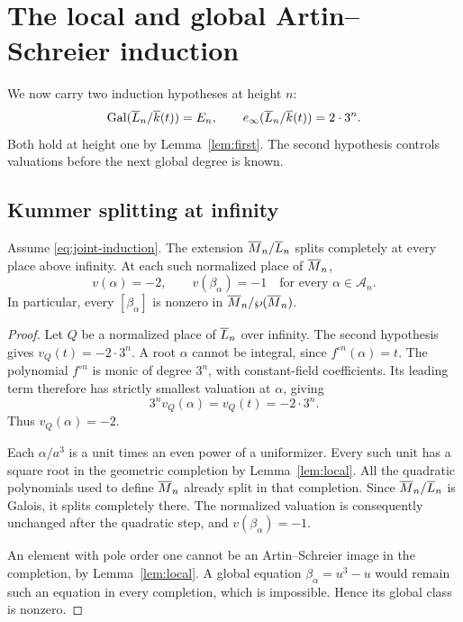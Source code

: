 \section{The local and global Artin--Schreier induction}\label{sec:as}

We now carry two induction hypotheses at height $n$:
\begin{equation}\label{eq:joint-induction}
 \operatorname{Gal}(\overline{L}_n/\overline{k}(t))=E_n,
 \qquad e_\infty(\overline{L}_n/\overline{k}(t))=2\cdot3^n.
\end{equation}
Both hold at height one by Lemma~\ref{lem:first}. The second
hypothesis controls valuations before the next global degree is
known.

\subsection{Kummer splitting at infinity}

\begin{lemma}\label{lem:pole}
Assume \eqref{eq:joint-induction}. The extension
$\overline{M}_n/\overline{L}_n$ splits completely at every place above infinity.
At each such normalized place of $\overline{M}_n$,
\begin{equation}\label{eq:beta-pole}
 v(\alpha)=-2,\qquad v(\beta_\alpha)=-1
 \quad\text{for every }\alpha\in\mathcal A_n.
\end{equation}
In particular, every $[\beta_\alpha]$ is nonzero in
$\overline{M}_n/\wp(\overline{M}_n)$.
\end{lemma}

\begin{proof}
Let $Q$ be a normalized place of $\overline{L}_n$ over infinity.
The second hypothesis gives $v_Q(t)=-2\cdot3^n$.
A root $\alpha$ cannot be integral, since $f^{\circ n}(\alpha)=t$.
The polynomial $f^{\circ n}$ is monic of degree $3^n$, with
constant-field coefficients. Its leading term therefore has
strictly smallest valuation at $\alpha$, giving
\[
 3^n v_Q(\alpha)=v_Q(t)=-2\cdot3^n.
\]
Thus $v_Q(\alpha)=-2$.

Each $\alpha/a^3$ is a unit times an even power of a uniformizer.
Every such unit has a square root in the geometric completion by
Lemma~\ref{lem:local}. All the quadratic polynomials used to
define $\overline{M}_n$ already split in that completion. Since
$\overline{M}_n/\overline{L}_n$ is Galois, it splits completely there. The
normalized valuation is consequently unchanged after the quadratic
step, and $v(\beta_\alpha)=-1$.

An element with pole order one cannot be an Artin--Schreier image
in the completion, by Lemma~\ref{lem:local}. A global equation
$\beta_\alpha=u^3-u$ would remain such an equation in every
completion, which is impossible. Hence its global class is nonzero.
\end{proof}


